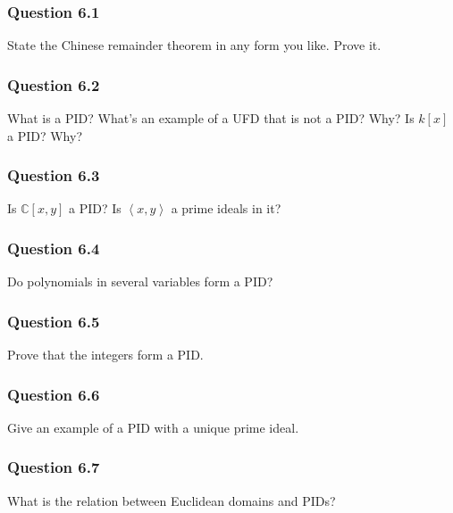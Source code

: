 \hypertarget{question-6.1}{%
\subsubsection{Question 6.1}\label{question-6.1}}

State the Chinese remainder theorem in any form you like. Prove it.

\hypertarget{question-6.2}{%
\subsubsection{Question 6.2}\label{question-6.2}}

What is a PID? What's an example of a UFD that is not a PID? Why? Is
\(k[x]\) a PID? Why?

\hypertarget{question-6.3}{%
\subsubsection{Question 6.3}\label{question-6.3}}

Is \({\mathbb{C}}[x, y]\) a PID? Is
\(\left\langle{ x, y }\right\rangle\) a prime ideals in it?

\hypertarget{question-6.4}{%
\subsubsection{Question 6.4}\label{question-6.4}}

Do polynomials in several variables form a PID?

\hypertarget{question-6.5}{%
\subsubsection{Question 6.5}\label{question-6.5}}

Prove that the integers form a PID.

\hypertarget{question-6.6}{%
\subsubsection{Question 6.6}\label{question-6.6}}

Give an example of a PID with a unique prime ideal.

\hypertarget{question-6.7}{%
\subsubsection{Question 6.7}\label{question-6.7}}

What is the relation between Euclidean domains and PIDs?


